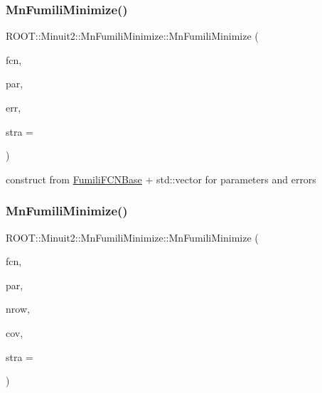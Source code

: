 \mbox{\label{classROOT_1_1Minuit2_1_1MnFumiliMinimize_a2e8cffba3a44be7488ead2240a1d3149}} 
\subsubsection{\texorpdfstring{MnFumiliMinimize()}{MnFumiliMinimize()}\hspace{0.1cm}{\footnotesize\ttfamily [8/21]}}
{\footnotesize\ttfamily R\+O\+O\+T\+::\+Minuit2\+::\+Mn\+Fumili\+Minimize\+::\+Mn\+Fumili\+Minimize (\begin{DoxyParamCaption}\item[{const \mbox{\hyperlink{classROOT_1_1Minuit2_1_1FumiliFCNBase}{Fumili\+F\+C\+N\+Base}} \&}]{fcn,  }\item[{const std\+::vector$<$ double $>$ \&}]{par,  }\item[{const std\+::vector$<$ double $>$ \&}]{err,  }\item[{unsigned int}]{stra = {} }\end{DoxyParamCaption})\hspace{0.3cm}{\ttfamily [inline]}}



construct from \mbox{\hyperlink{classROOT_1_1Minuit2_1_1FumiliFCNBase}{Fumili\+F\+C\+N\+Base}} + std\+::vector for parameters and errors 

\mbox{\label{classROOT_1_1Minuit2_1_1MnFumiliMinimize_ad12e919e837251ef358a0d461355e51c}} 
\subsubsection{\texorpdfstring{MnFumiliMinimize()}{MnFumiliMinimize()}\hspace{0.1cm}{\footnotesize\ttfamily [9/21]}}
{\footnotesize\ttfamily R\+O\+O\+T\+::\+Minuit2\+::\+Mn\+Fumili\+Minimize\+::\+Mn\+Fumili\+Minimize (\begin{DoxyParamCaption}\item[{const \mbox{\hyperlink{classROOT_1_1Minuit2_1_1FumiliFCNBase}{Fumili\+F\+C\+N\+Base}} \&}]{fcn,  }\item[{const std\+::vector$<$ double $>$ \&}]{par,  }\item[{unsigned int}]{nrow,  }\item[{const std\+::vector$<$ double $>$ \&}]{cov,  }\item[{unsigned int}]{stra = {} }\end{DoxyParamCaption})\hspace{0.3cm}{\ttfamily [inline]}}



